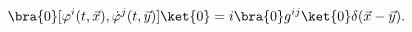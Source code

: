 \begin{equation}
\bra{0}[\varphi^i(t,\vec{x}),\dot{\varphi}^j(t,\vec{y})]\ket{0}
=i\bra{0}g^{ij}\ket{0}\delta(\vec{x}-\vec{y}).\label{VEVCCR}
\end{equation}


